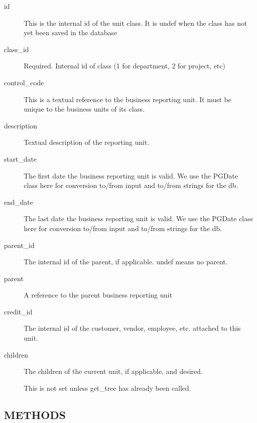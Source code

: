 \begin{description}
\begin{description}
\begin{description}
\begin{description}
\begin{description}
\begin{description}
\begin{description}
\begin{description}
\begin{description}
\begin{description}
\begin{description}
\item[{id}] \mbox{}

This is the internal id of the unit class.  It is undef when the class has not
yet been saved in the database


\item[{class\_id}] \mbox{}

Required. Internal id of class (1 for department, 2 for project, etc)


\item[{control\_code}] \mbox{}

This is a textual reference to the business reporting unit.  It must be unique
to the business units of its class.


\item[{description}] \mbox{}

Textual description of the reporting unit.


\item[{start\_date}] \mbox{}

The first date the business reporting unit is valid.  We use the PGDate class
here for conversion to/from input and to/from strings for the db.


\item[{end\_date}] \mbox{}

The last date the business reporting unit is valid.  We use the PGDate class
here for conversion to/from input and to/from strings for the db.


\item[{parent\_id}] \mbox{}

The internal id of the parent, if applicable.  undef means no parent.


\item[{parent}] \mbox{}

A reference to the parent business reporting unit


\item[{credit\_id}] \mbox{}

The internal id of the customer, vendor, employee, etc. attached to this 
unit.


\item[{children}] \mbox{}

The children of the current unit, if applicable, and desired.



This is not set unless get\_tree has already been called.

\end{description}
\subsection*{METHODS\label{LedgerSMB::DBObject::Business_Unit_Class_METHODS}}
\begin{description}


\end{description}
\end{description}
\end{description}
\end{description}
\end{description}
\end{description}
\end{description}
\end{description}
\end{description}
\end{description}
\end{description}
